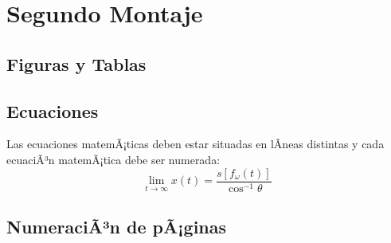 \documentclass[10pt,conference,a4paper]{IEEEtran}
\begin{document}
\section{Segundo Montaje}

\subsection{Figuras y Tablas}




\subsection{Ecuaciones}

Las ecuaciones matemÃ¡ticas deben estar situadas en lÃ­neas distintas y cada
ecuaciÃ³n matemÃ¡tica debe ser numerada:
\begin{equation}
    \underset{t\rightarrow\infty}{\lim}x(t)=\frac{s[f_{\omega}(t)]}{\cos
    ^{-1}\theta}
\end{equation}

\subsection{NumeraciÃ³n de pÃ¡ginas}
\end{document}
